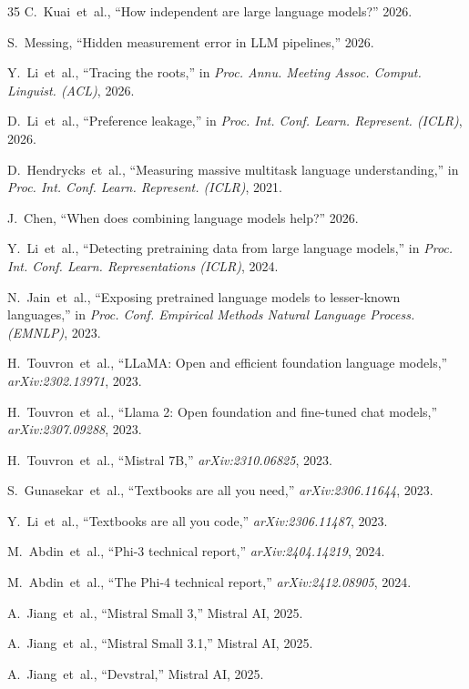 \documentclass[journal]{IEEEtran}
\begin{document}
\begin{thebibliography}{35}
C.~Kuai~et~al., ``How independent are large language models?'' 2026.

S.~Messing, ``Hidden measurement error in LLM pipelines,'' 2026.

Y.~Li~et~al., ``Tracing the roots,'' in \emph{Proc. Annu. Meeting Assoc. Comput. Linguist. (ACL)}, 2026.

D.~Li~et~al., ``Preference leakage,'' in \emph{Proc. Int. Conf. Learn. Represent. (ICLR)}, 2026.

D.~Hendrycks~et~al., ``Measuring massive multitask language understanding,'' in \emph{Proc. Int. Conf. Learn. Represent. (ICLR)}, 2021.

J.~Chen, ``When does combining language models help?'' 2026.

Y.~Li~et~al., ``Detecting pretraining data from large language models,'' in \emph{Proc. Int. Conf. Learn. Representations (ICLR)}, 2024.

N.~Jain~et~al., ``Exposing pretrained language models to lesser-known languages,'' in \emph{Proc. Conf. Empirical Methods Natural Language Process. (EMNLP)}, 2023.

H.~Touvron~et~al., ``LLaMA: Open and efficient foundation language models,'' \emph{arXiv:2302.13971}, 2023.

H.~Touvron~et~al., ``Llama 2: Open foundation and fine-tuned chat models,'' \emph{arXiv:2307.09288}, 2023.

H.~Touvron~et~al., ``Mistral 7B,'' \emph{arXiv:2310.06825}, 2023.

S.~Gunasekar~et~al., ``Textbooks are all you need,'' \emph{arXiv:2306.11644}, 2023.

Y.~Li~et~al., ``Textbooks are all you code,'' \emph{arXiv:2306.11487}, 2023.

M.~Abdin~et~al., ``Phi-3 technical report,'' \emph{arXiv:2404.14219}, 2024.

M.~Abdin~et~al., ``The Phi-4 technical report,'' \emph{arXiv:2412.08905}, 2024.

A.~Jiang~et~al., ``Mistral Small 3,'' Mistral AI, 2025.

A.~Jiang~et~al., ``Mistral Small 3.1,'' Mistral AI, 2025.

A.~Jiang~et~al., ``Devstral,'' Mistral AI, 2025.


\end{thebibliography}
\end{document}
